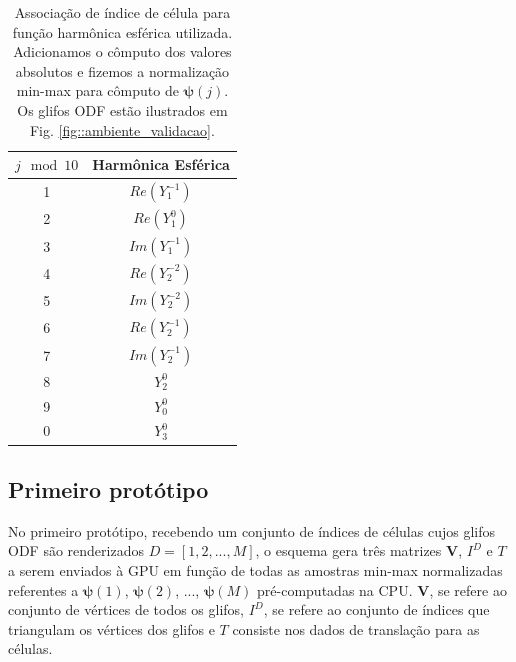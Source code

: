 \documentclass[
    12pt,                %
    oneside,            %
    a4paper,            %
    english,            %
    french,                %
    spanish,            %
    brazil                %
    ]{abntex2}
\begin{document}
\begin{table}[ht]
\centering
\begin{tabular}{cc}
$j \mod 10$ & Harmônica Esférica \\ \hline
1 & $Re(Y_1^{-1})$  \\
2 & $Re(Y_1^0)$     \\
3 & $Im(Y_1^{-1})$  \\
4 & $Re(Y_2^{-2})$  \\
5 & $Im(Y_2^{-2})$  \\
6 & $Re(Y_2^{-1})$  \\
7 & $Im(Y_2^{-1})$  \\
8 & $Y_2^0$         \\
9 & $Y_0^0$         \\
0 & $Y_3^0$        
\end{tabular}
\caption{Associação de índice de célula para função harmônica esférica utilizada. Adicionamos o cômputo dos valores absolutos e fizemos a normalização min-max para cômputo de $\boldsymbol{\psi}(j)$. Os glifos ODF estão ilustrados em Fig. \ref{fig::ambiente_validacao}.}
\label{tab::harmonicas_esfericas}
\end{table}




\subsection{Primeiro protótipo}
\label{sec::primeiro_prototipo}

No primeiro protótipo, recebendo um conjunto de índices de células cujos glifos ODF são renderizados $D = [
1,
2, ..., 
M
]$, o esquema gera três matrizes $\mathbf{V}$, $I^D$ e $T$ a serem enviados à GPU em função de todas as amostras min-max normalizadas referentes a
$\boldsymbol{\psi}(1)$,
$\boldsymbol{\psi}(2)$, ...,
$\boldsymbol{\psi}(M)$ pré-computadas na CPU. $\mathbf{V}$, se refere ao conjunto de vértices de todos os glifos, $I^D$, se refere ao conjunto de índices que triangulam os vértices dos glifos e $T$ consiste nos dados de translação para as células.


\end{document}
